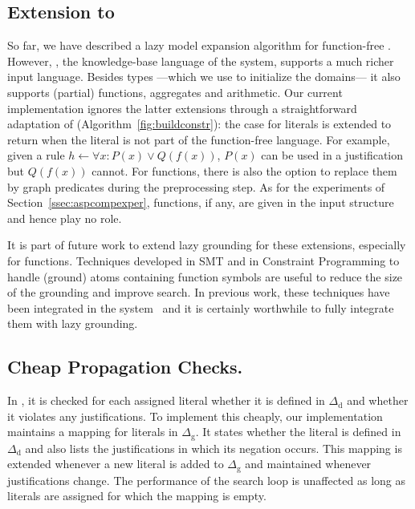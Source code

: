 \documentclass[11pt]{article}
\newcommand{\m}[1]{\ensuremath{#1}\xspace}
\newcommand{\lrule}{\m{\leftarrow}}
\newcommand{\D}{\m{\Delta}}
\newcommand{\logicname}[1]{\text{\sc #1}\xspace}
\newcommand{\idp}{\logicname{IDP}}
\newcommand{\fodotidp}{\logicname{FO(\ensuremath{\cdot})\ensuremath{^{\mathtt{IDP}}}}}
\newcommand{\foid}{\logicname{FO(\ensuremath{ID})}}
\theoremstyle{plain}
\theoremstyle{definition}
\theoremstyle{example_basic}
\theoremstyle{example_contd}
\theoremstyle{plain}
\newcommand{\Dg}{\ensuremath{\D_\text{g}}\xspace}
\newcommand{\Dd}{\ensuremath{\D_\text{d}}\xspace}
\newcommand{\change}[1]{#1}
\begin{document}
\subsection{Extension to \fodotidp}
So far, we have described a lazy model expansion algorithm for
function-free \foid.  However, \fodotidp, the knowledge-base language
of the \idp system, supports a much richer input language.
\change{Besides types ---which we use to initialize the domains--- it
  also supports (partial) functions, aggregates and arithmetic. Our
  current implementation ignores the latter extensions through a
  straightforward adaptation of
  \buildconstr(Algorithm~\ref{fig:buildconstr}): the case for literals
  is extended to return \algfalse when the literal is not part of the
  function-free \foid language. For example, given a rule $h \lrule
  \forall x: P(x) \lor Q(f(x))$, $P(x)$ can be used in a justification
  but $Q(f(x))$ cannot. For functions, there is also the option to
replace them by graph predicates during the preprocessing step. As for
the experiments of Section~\ref{ssec:aspcompexper}, functions, if any,
are given in the input structure and hence play no role.
}

\change{It is part of future work to extend lazy grounding for these
  extensions, especially for functions. Techniques developed in SMT
  and in Constraint Programming to handle (ground) atoms containing
  function symbols are useful to reduce the size of the grounding and
  improve search. In previous work, these techniques have been
  integrated in the \idp system~\cite{ictai/DeCat13} and it is
  certainly worthwhile to fully integrate them with lazy grounding.}

\subsection{Cheap Propagation Checks.} 
In \lazymx, it is checked for each assigned
literal whether it is defined in \Dd and whether it
violates any justifications. To implement this cheaply, 
\change{our implementation maintains a mapping} for literals in \Dg. \change{It states whether
  the literal is defined in \Dd and also lists the justifications in
  which its negation occurs.}
This mapping is extended  whenever a new literal is  added to \Dg and maintained whenever justifications change.  The performance of the search loop is unaffected as long as literals are assigned for which the mapping is empty.
\end{document}
